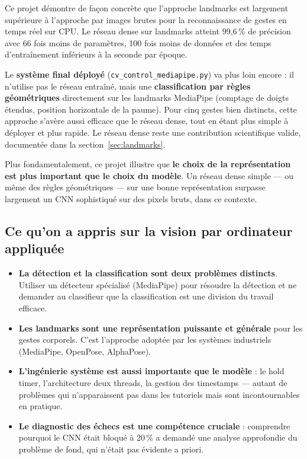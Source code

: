 \documentclass[12pt, a4paper]{article}
\newcommand{\code}[1]{\texttt{\small #1}}
\begin{document}
Ce projet démontre de façon concrète que l'approche landmarks est largement
supérieure à l'approche par images brutes pour la reconnaissance de gestes
en temps réel sur CPU. Le réseau dense sur landmarks atteint 99,6\,\% de
précision avec 66 fois moins de paramètres, 100 fois moins de données et
des temps d'entraînement inférieurs à la seconde par époque.

Le \textbf{système final déployé} (\code{cv\_control\_mediapipe.py}) va plus
loin encore : il n'utilise pas le réseau entraîné, mais une \textbf{classification
par règles géométriques} directement sur les landmarks MediaPipe (comptage de
doigts étendus, position horizontale de la paume). Pour cinq gestes bien distincts,
cette approche s'avère aussi efficace que le réseau dense, tout en étant plus
simple à déployer et plus rapide. Le réseau dense reste une contribution
scientifique valide, documentée dans la section~\ref{sec:landmarks}.

Plus fondamentalement, ce projet illustre que \textbf{le choix de la
représentation est plus important que le choix du modèle}. Un réseau dense
simple --- ou même des règles géométriques --- sur une bonne représentation
surpasse largement un CNN sophistiqué sur des pixels bruts, dans ce contexte.

\subsection{Ce qu'on a appris sur la vision par ordinateur appliquée}

\begin{itemize}
  \item \textbf{La détection et la classification sont deux problèmes distincts}.
        Utiliser un détecteur spécialisé (MediaPipe) pour résoudre la détection
        et ne demander au classifieur que la classification est une division du
        travail efficace.
  \item \textbf{Les landmarks sont une représentation puissante et générale}
        pour les gestes corporels. C'est l'approche adoptée par les systèmes
        industriels (MediaPipe, OpenPose, AlphaPose).
  \item \textbf{L'ingénierie système est aussi importante que le modèle} : le
        hold timer, l'architecture deux threads, la gestion des timestamps --- autant
        de problèmes qui n'apparaissent pas dans les tutoriels mais sont
        incontournables en pratique.
  \item \textbf{Le diagnostic des échecs est une compétence cruciale} : comprendre
        pourquoi le CNN était bloqué à 20\,\% a demandé une analyse approfondie du
        problème de fond, qui n'était pas évidente a priori.
\end{itemize}
\end{document}
